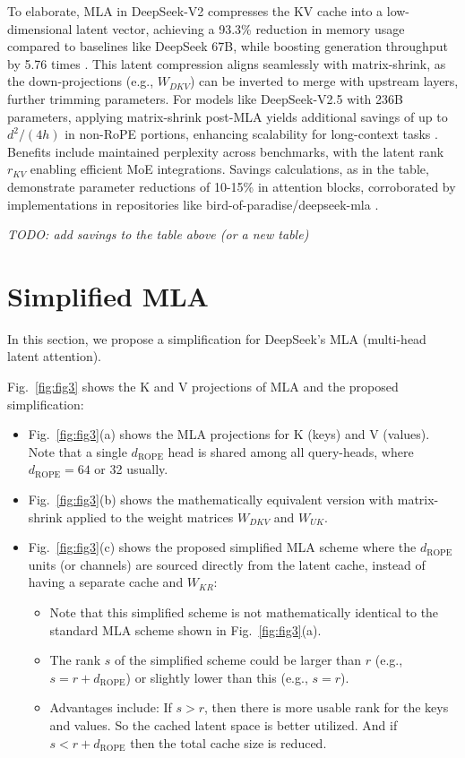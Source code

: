 \documentclass{article}
\begin{document}
To elaborate, MLA in DeepSeek-V2 compresses the KV cache into a low-dimensional latent vector, achieving a 93.3\% reduction in memory usage compared to baselines like DeepSeek 67B, while boosting generation throughput by 5.76 times \cite{deepseek2024}. This latent compression aligns seamlessly with matrix-shrink, as the down-projections (e.g., $W_{DKV}$) can be inverted to merge with upstream layers, further trimming parameters. For models like DeepSeek-V2.5 with 236B parameters, applying matrix-shrink post-MLA yields additional savings of up to $d^{2} / (4h)$ in non-RoPE portions, enhancing scalability for long-context tasks \cite{medium2025deepseek}. Benefits include maintained perplexity across benchmarks, with the latent rank $r_{KV}$ enabling efficient MoE integrations. Savings calculations, as in the table, demonstrate parameter reductions of 10-15\% in attention blocks, corroborated by implementations in repositories like bird-of-paradise/deepseek-mla \cite{towardsai2024mla}.

\textit{TODO: add savings to the table above (or a new table)}

\section{Simplified MLA}
In this section, we propose a simplification for DeepSeek’s MLA (multi-head latent attention).

Fig.~\ref{fig:fig3} shows the K and V projections of MLA and the proposed simplification:

\begin{itemize}
\item Fig.~\ref{fig:fig3}(a) shows the MLA projections for K (keys) and V (values). Note that a single $d_{\text{ROPE}}$ head is shared among all query-heads, where $d_{\text{ROPE}} = 64$ or 32 usually.
\item Fig.~\ref{fig:fig3}(b) shows the mathematically equivalent version with matrix-shrink applied to the weight matrices $W_{DKV}$ and $W_{UK}$.
\item Fig.~\ref{fig:fig3}(c) shows the proposed simplified MLA scheme where the $d_{\text{ROPE}}$ units (or channels) are sourced directly from the latent cache, instead of having a separate cache and $W_{KR}$:
  \begin{itemize}
    \item Note that this simplified scheme is not mathematically identical to the standard MLA scheme shown in Fig.~\ref{fig:fig3}(a).
    \item The rank $s$ of the simplified scheme could be larger than $r$ (e.g., $s = r + d_{\text{ROPE}}$) or slightly lower than this (e.g., $s = r$).
    \item Advantages include: If $s > r$, then there is more usable rank for the keys and values. So the cached latent space is better utilized. And if $s < r + d_{\text{ROPE}}$ then the total cache size is reduced.
  \end{itemize}
\end{itemize}
\end{document}
